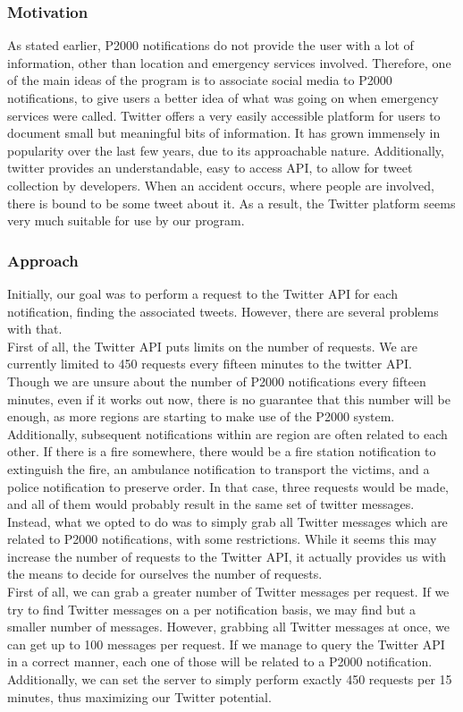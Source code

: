 \subsubsection*{Motivation}
As stated earlier, P2000 notifications do not provide the user with a lot of information, other than location and emergency services involved.
Therefore, one of the main ideas of the program is to associate social media to P2000 notifications, to give users a better idea of what was going on when emergency services were called.
Twitter offers a very easily accessible platform for users to document small but meaningful bits of information.
It has grown immensely in popularity over the last few years, due to its approachable nature.
Additionally, twitter provides an understandable, easy to access API, to allow for tweet collection by developers.
When an accident occurs, where people are involved, there is bound to be some tweet about it.
As a result, the Twitter platform seems very much suitable for use by our program.

\subsubsection*{Approach}
Initially, our goal was to perform a request to the Twitter API for each notification, finding the associated tweets.
However, there are several problems with that. \\
First of all, the Twitter API puts limits on the number of requests.
We are currently limited to 450 requests every fifteen minutes to the twitter API.
Though we are unsure about the number of P2000 notifications every fifteen minutes, even if it works out now, there is no guarantee that this number will be enough, as more regions are starting to make use of the P2000 system.
Additionally, subsequent notifications within are region are often related to each other.
If there is a fire somewhere, there would be a fire station notification to extinguish the fire, an ambulance notification to transport the victims, and a police notification to preserve order.
In that case, three requests would be made, and all of them would probably result in the same set of twitter messages. \\

Instead, what we opted to do was to simply grab all Twitter messages which are related to P2000 notifications, with some restrictions.
While it seems this may increase the number of requests to the Twitter API, it actually provides us with the means to decide for ourselves the number of requests. \\
First of all, we can grab a greater number of Twitter messages per request. 
If we try to find Twitter messages on a per notification basis, we may find but a smaller number of messages.
However, grabbing all Twitter messages at once, we can get up to 100 messages per request.
If we manage to query the Twitter API in a correct manner, each one of those will be related to a P2000 notification.
Additionally, we can set the server to simply perform exactly 450 requests per 15 minutes, thus maximizing our Twitter potential. \\


